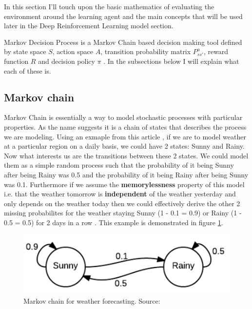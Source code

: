In this section I'll touch upon the basic mathematics of evaluating the environment around the learning agent and the 
main concepts that will be used later in the 
Deep Reinforcement Learning model section.

Markov Decision Process is a Markov Chain based decision making
tool defined by state space $S$, action space $A$, transition 
probability matrix $P^{a}_{ss'}$, reward 
function $R$ and decision policy $\pi$ \cite{lecture_mdp}. In 
the subsections below I will explain what each of these is.

\subsection{Markov chain}
Markov Chain is essentially a way to model stochastic
processes with particular properties. As the name suggests it is a chain of states that describes the process we are modeling. Using an exmaple from this article \cite{markov_chain_article}, if we
are to model weather at a particular region on a daily basis,
we could have 2 states: Sunny and Rainy. Now what interests us
are the transitions between these 2 states. We could model
them as a simple random process such that the probability of
it being Sunny after being Rainy was 0.5 and the probability
of it being Rainy after being Sunny was 0.1. Furthermore if we
assume the \textbf{memorylessness} property of this model i.e.
that the weather tomorrow is \textbf{independent} of the
weather yesterday and only depends on the weather today then
we could effectively derive the other 2 missing probabilites
for the weather staying Sunny (1 - 0.1 = 0.9) or Rainy (1 -
0.5 = 0.5) for 2 days in a row \cite{markov_chain_article}. This example is demonstrated in figure \ref{fig:weather}.

\begin{figure}[H]
  \centering
  \includegraphics[scale=0.7]{figures/markov_weather.PNG}
  \caption{Markov chain for weather forecasting. Source: \cite{markov_chain_article}}
  \label{fig:weather}
\end{figure}

